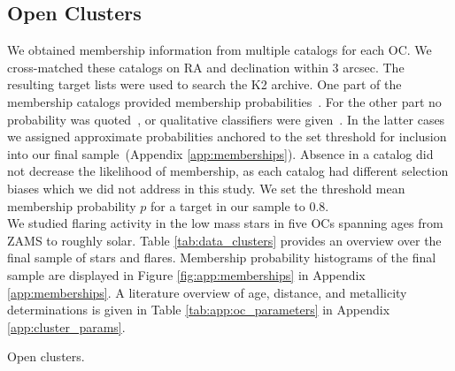 \documentclass{aa}
\begin{document}
\subsection{Open Clusters}
We obtained membership information from multiple catalogs for each OC. We cross-matched these catalogs on RA and declination within 3 arcsec. The resulting target lists were used to search the K2 archive. One part of the membership catalogs provided membership probabilities~\citep{douglas_praesepe_hyades_2014, cantat_gaudin_2018, olivares_pleiades_2018, reino_hyades_2018, gao_m67mem_2018, olivares_ngc6774_2019}. For the other part no probability was quoted~\citep{rebull_pleiadesrot_2016, douglas_poking_2017, gaia_dr2_2018_hrd}, or qualitative classifiers were given~\citep{curtis_ruprecht_2013, gonzalez_m67mem_2016,rebull_praesepe_2017}. In the latter cases we assigned approximate probabilities anchored to the set threshold for inclusion into our final sample~(Appendix \ref{app:memberships}). Absence in a catalog did not decrease the likelihood of membership, as each catalog had different selection biases which we did not address in this study. We set the threshold mean membership probability $p$ for a target in our sample to 0.8.
\\
We studied flaring activity in the low mass stars in five OCs spanning ages from ZAMS to roughly solar. Table \ref{tab:data_clusters} provides an overview over the final sample of stars and flares. Membership probability histograms of the final sample are displayed in Figure \ref{fig:app:memberships} in Appendix \ref{app:memberships}. A literature overview of age, distance, and metallicity determinations is given in Table \ref{tab:app:oc_parameters} in Appendix \ref{app:cluster_params}. 
\begin{table}
\caption{Open clusters.}
\label{tab:data_clusters}
\centering

\end{table}
\end{document}
